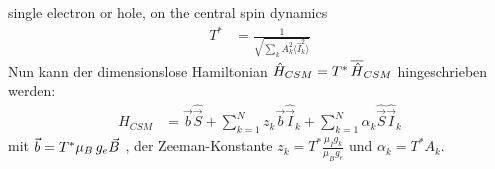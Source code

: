 single electron or hole, on the central spin dynamics 
\begin{align}
    T^* &= \frac{1}{\sqrt{\sum_k A_k^2\langle \hat{I}_k^2 \rangle}}
\end{align}
Nun kann der dimensionslose Hamiltonian $\hat{H}_{CSM} = T^*\thinspace\overline{\hat{H}}_{CSM}$ hingeschrieben werden:
\begin{align}
    \hat{H}_{CSM} &= \vec{b}\hat{\vec{S}} +  \sum_{k=1}^{N}z_k\vec{b}\hat{\vec{I}}_k + \sum_{k=1}^{N} \alpha_k \hat{\vec{S}}\hat{\vec{I}}_k
\end{align}
mit $\vec{b}=T^*\mu_B\thinspace g_e \vec{B}$ , der Zeeman-Konstante $z_k=T^*\frac{\mu_I g_k}{\mu_B g_e}$ und $\alpha_k = T^* A_k$.


